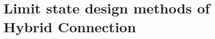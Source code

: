 \chapter{Limit state design methods of Hybrid Connection}
\label{ch7}

\begin{spacing}{1.25} %
\minitoc %
\end{spacing} %
\onehalfspacing %


%